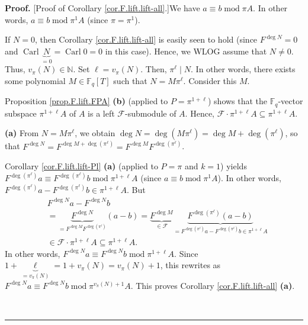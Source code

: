 \documentclass[numbers=enddot,12pt,final,onecolumn,notitlepage]{scrartcl}%
\theoremstyle{definition}
\newenvironment{proof}[1][Proof]{\noindent\textbf{#1.} }{\ \rule{0.5em}{0.5em}}
\begin{document}
\begin{proof}
[Proof of Corollary \ref{cor.F.lift.lift-all}.]We have $a\equiv
b\operatorname{mod}\pi A$. In other words, $a\equiv b\operatorname{mod}\pi
^{1}A$ (since $\pi=\pi^{1}$).

If $N=0$, then Corollary \ref{cor.F.lift.lift-all} is easily seen to hold
(since $F^{\deg N}=0$ and $\operatorname*{Carl}\underbrace{N}_{=0}%
=\operatorname*{Carl}0=0$ in this case). Hence, we WLOG assume that $N\neq0$.
Thus, $v_{\pi}\left(  N\right)  \in\mathbb{N}$. Set $\ell=v_{\pi}\left(
N\right)  $. Then, $\pi^{\ell}\mid N$. In other words, there exists some
polynomial $M\in\mathbb{F}_{q}\left[  T\right]  $ such that $N=M\pi^{\ell}$.
Consider this $M$.

Proposition \ref{prop.F.lift.FPA} \textbf{(b)} (applied to $P=\pi^{1+\ell}$)
shows that the $\mathbb{F}_{q}$-vector subspace $\pi^{1+\ell}A$ of $A$ is a
left $\mathcal{F}$-submodule of $A$. Hence, $\mathcal{F}\cdot\pi^{1+\ell
}A\subseteq\pi^{1+\ell}A$.

\textbf{(a)} From $N=M\pi^{\ell}$, we obtain $\deg N=\deg\left(  M\pi^{\ell
}\right)  =\deg M+\deg\left(  \pi^{\ell}\right)  $, so that $F^{\deg
N}=F^{\deg M+\deg\left(  \pi^{\ell}\right)  }=F^{\deg M}F^{\deg\left(
\pi^{\ell}\right)  }$.

Corollary \ref{cor.F.lift.lift-Pl} \textbf{(a)} (applied to $P=\pi$ and $k=1$)
yields \newline$F^{\deg\left(  \pi^{\ell}\right)  }a\equiv F^{\deg\left(
\pi^{\ell}\right)  }b\operatorname{mod}\pi^{1+\ell}A$ (since $a\equiv
b\operatorname{mod}\pi^{1}A$). In other words, $F^{\deg\left(  \pi^{\ell
}\right)  }a-F^{\deg\left(  \pi^{\ell}\right)  }b\in\pi^{1+\ell}A$. But
\begin{align*}
&  F^{\deg N}a-F^{\deg N}b\\
&  =\underbrace{F^{\deg N}}_{=F^{\deg M}F^{\deg\left(  \pi^{\ell}\right)  }%
}\left(  a-b\right)  =\underbrace{F^{\deg M}}_{\in\mathcal{F}}%
\underbrace{F^{\deg\left(  \pi^{\ell}\right)  }\left(  a-b\right)  }%
_{=F^{\deg\left(  \pi^{\ell}\right)  }a-F^{\deg\left(  \pi^{\ell}\right)
}b\in\pi^{1+\ell}A}\\
&  \in\mathcal{F}\cdot\pi^{1+\ell}A\subseteq\pi^{1+\ell}A.
\end{align*}
In other words, $F^{\deg N}a\equiv F^{\deg N}b\operatorname{mod}\pi^{1+\ell}%
A$. Since $1+\underbrace{\ell}_{=v_{\pi}\left(  N\right)  }=1+v_{\pi}\left(
N\right)  =v_{\pi}\left(  N\right)  +1$, this rewrites as $F^{\deg N}a\equiv
F^{\deg N}b\operatorname{mod}\pi^{v_{\pi}\left(  N\right)  +1}A$. This proves
Corollary \ref{cor.F.lift.lift-all} \textbf{(a)}.


\end{proof}
\end{document}
